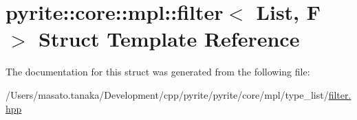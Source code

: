 \hypertarget{structpyrite_1_1core_1_1mpl_1_1filter}{}\section{pyrite\+:\+:core\+:\+:mpl\+:\+:filter$<$ List, F $>$ Struct Template Reference}
\label{structpyrite_1_1core_1_1mpl_1_1filter}


The documentation for this struct was generated from the following file\+:\begin{DoxyCompactItemize}
\item 
/\+Users/masato.\+tanaka/\+Development/cpp/pyrite/pyrite/core/mpl/type\+\_\+list/\mbox{\hyperlink{core_2mpl_2type__list_2filter_8hpp}{filter.\+hpp}}\end{DoxyCompactItemize}
